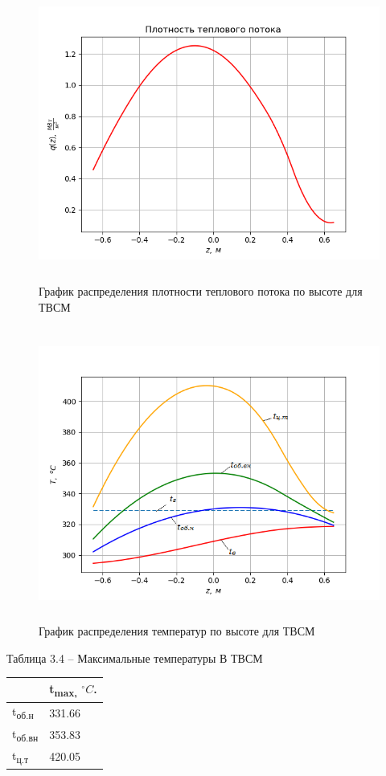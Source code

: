 \begin{figure}[!h]
\center
\includegraphics[width=5.11811in,height=3.80659in]{media/image15.png}
\caption{График распределения плотности теплового потока по высоте
для ТВСМ}
\end{figure}

\begin{figure}[!h]
\center
\includegraphics[width=5.11811in,height=3.80712in]{media/image16.png}
\caption{График распределения температур по высоте для ТВСМ}
\end{figure}

Таблица 3.4 -- Максимальные температуры В ТВСМ

\begin{longtable}[]{@{}ll@{}}
\toprule
& t\textsubscript{max,} $^\circ C$.\tabularnewline
\midrule
\endhead
t\textsubscript{об.н} & 331.66\tabularnewline
t\textsubscript{об.вн} & 353.83\tabularnewline
t\textsubscript{ц.т} & 420.05\tabularnewline
\bottomrule
\end{longtable}

